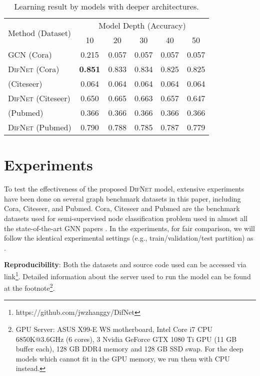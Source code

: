 \documentclass{article}
\newcommand{\our}{\textsc{DifNet}}
\newcommand{\gcn}{\textsc{GCN}}
\begin{document}
\begin{table}[t]
\caption{Learning result by models with deeper architectures.}\label{tab:suspended_animation}
\centering
\small
\setlength{\tabcolsep}{4pt}
\begin{tabular}{l c c  c  c  c }
\toprule
 \multirow{2}{*}{Method (Dataset)}  & \multicolumn{5}{c}{Model Depth (Accuracy)} \\
 \addlinespace[0.05cm]
\cline{2-6}
\addlinespace[0.05cm]
& {10} & {20} & {30} & {40} & {50} \\
\addlinespace[0.05cm]
\hline
\addlinespace[0.05cm]

{\gcn} (Cora)  &0.215  &0.057  &0.057 &{0.057} &{0.057} \\

{\our} (Cora) &\textbf{0.851}  &{0.833}  &{0.834} &{0.825} &{0.825} \\
\hline
\addlinespace[0.05cm]
{\gcn} (Citeseer)&0.064  &0.064  &0.064 &{0.064} &{0.064} \\

{\our} (Citeseer) &0.650  &{0.665}  &{0.663} &{0.657} &{0.647} \\
\hline
\addlinespace[0.05cm]
{\gcn} (Pubmed) &0.366 &0.366  &0.366 &{0.366} &{0.366} \\

{\our} (Pubmed) &0.790  &{0.788}  &{0.785} &{0.787} &{0.779}\\
\bottomrule
\end{tabular}
\vspace{-10pt}
\end{table}




\section{Experiments}\label{sec:experiment}
 
To test the effectiveness of the proposed {\our} model, extensive experiments have been done on several graph benchmark datasets in this paper, including Cora, Citeseer, and Pubmed. Cora, Citeseer and Pubmed are the benchmark datasets used for semi-supervised node classification problem used in almost all the state-of-the-art GNN papers \cite{Kipf_Semi_CORR_16,Velickovic_Graph_ICLR_18,Zhang_GResNet_19}. In the experiments, for fair comparison, we will follow the identical experimental settings (e.g., train/validation/test partition) as \cite{Kipf_Semi_CORR_16}.

\noindent \textbf{Reproducibility}: Both the datasets and source code used can be accessed via link\footnote{https://github.com/jwzhanggy/DifNet}. Detailed information about the server used to run the model can be found at the footnote\footnote{GPU Server: ASUS X99-E WS motherboard, Intel Core i7 CPU 6850K@3.6GHz (6 cores), 3 Nvidia GeForce GTX 1080 Ti GPU (11 GB buffer each), 128 GB DDR4 memory and 128 GB SSD swap. For the deep models which cannot fit in the GPU memory, we run them with CPU instead.}.
\end{document}

